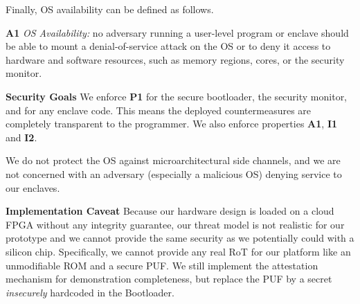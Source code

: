 Finally, OS availability can be defined as follows.

\noindent\textbf{A1} \emph{OS Availability:}  no adversary running a user-level program or enclave should be able to mount a denial-of-service attack on the OS or to deny it access to hardware and software resources, such as memory regions, cores, or the security monitor.

\textbf{Security Goals}
We enforce \textbf{P1} for the secure bootloader, the security monitor, and for any enclave code.
This means the deployed countermeasures are completely transparent to the programmer.
We also enforce properties \textbf{A1}, \textbf{I1} and \textbf{I2}.

We do not protect the OS against microarchitectural side channels, and we are not concerned with an adversary (especially a malicious OS) denying service to our enclaves.

\textbf{Implementation Caveat}
Because our hardware design is loaded on a cloud FPGA without any integrity guarantee, our threat model is not realistic for our prototype and we cannot provide the same security as we potentially could with a silicon chip.
Specifically, we cannot provide any real RoT for our platform like an unmodifiable ROM and a secure PUF.
We still implement the attestation mechanism for demonstration completeness, but replace the PUF by a secret \emph{insecurely} hardcoded in the Bootloader.